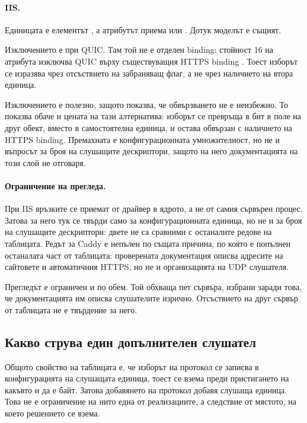 \paragraph{IIS.} Единицата е елементът , а атрибутът  приема
 или  \cite{iisbinding}. Дотук моделът е същият.

Изключението е при QUIC. Там той не е отделен binding: стойност 16 на атрибута 
изключва QUIC върху съществуващия HTTPS binding \cite{iisbinding}. Тоест изборът се изразява
чрез отсъствието на забраняващ флаг, а не чрез наличието на втора единица.

Изключението е полезно, защото показва, че обвързването не е неизбежно. То показва обаче и
цената на тази алтернатива: изборът се превръща в бит в поле на друг обект, вместо в
самостоятелна единица, и остава обвързан с наличието на HTTPS binding. Премахната е
конфигурационната умножителност, но не и въпросът за броя на слушащите дескриптори, защото на
него документацията на този слой не отговаря.

\paragraph{Ограничение на прегледа.} При IIS връзките се приемат от драйвер в ядрото, а не от
самия сървърен процес. Затова за него тук се твърди само за конфигурационната единица, но не
и за броя на слушащите дескриптори: двете не са сравними с останалите редове на таблицата.
Редът за Caddy е непълен по същата причина, по която е попълнен останалата част от таблицата:
проверената документация описва адресите на сайтовете и автоматичния HTTPS, но не и
организацията на UDP слушателя.

Прегледът е ограничен и по обем. Той обхваща пет сървъра, избрани заради това, че
документацията им описва слушателите изрично. Отсъствието на друг сървър от таблицата не е
твърдение за него.

\subsection{Какво струва един допълнителен слушател}
\label{sec:cost}

Общото свойство на таблицата е, че изборът на протокол се записва в конфигурацията на
слушащата единица, тоест се взема преди пристигането на какъвто и да е байт. Затова
добавянето на протокол добавя слушаща единица. Това не е ограничение на нито една от
реализациите, а следствие от мястото, на което решението се взема.


